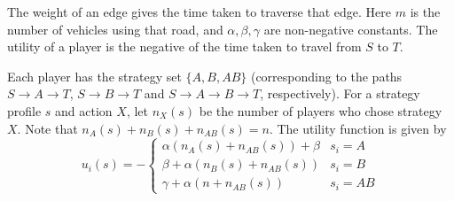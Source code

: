 \begin{center}
\end{center}

The weight of an edge gives the time taken to traverse that edge.
Here $m$ is the number of vehicles using that road,
and $\alpha, \beta, \gamma$ are non-negative constants.
The utility of a player is the negative of the time taken to travel from $S$ to $T$.

Each player has the strategy set $\{A, B, AB\}$ (corresponding to the paths
$S \rightarrow A \rightarrow T$, $S \rightarrow B \rightarrow T$
and $S \rightarrow A \rightarrow B \rightarrow T$, respectively).
For a strategy profile $s$ and action $X$,
let $n_X(s)$ be the number of players who chose strategy $X$.
Note that $n_A(s) + n_B(s) + n_{AB}(s) = n$.
The utility function is given by
\[ u_i(s) = -\begin{cases}
\alpha(n_A(s) + n_{AB}(s)) + \beta & s_i = A
\\ \beta + \alpha(n_B(s) + n_{AB}(s)) & s_i = B
\\ \gamma + \alpha (n + n_{AB}(s)) & s_i = AB
\end{cases} \]

